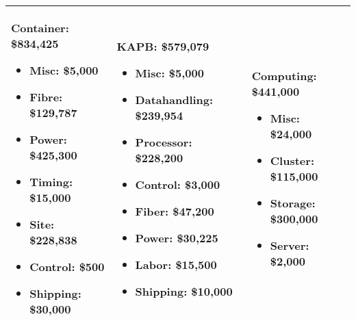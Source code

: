 \begin{table}[t]
\begin{tabular}{| p{2in} | p{2in} | p{2in} | }
\noindent
\textbf{Container:}  \$834,425
\begin{itemize}[parsep=-2pt, itemsep=-3pt]
\item Misc:   \$5,000
\item Fibre:   \$129,787
\item Power:   \$425,300
\item Timing:   \$15,000
\item Site:   \$228,838
\item Control:   \$500
\item Shipping:   \$30,000
\end{itemize}
 &
 \noindent
\textbf{KAPB:}  \$579,079
\begin{itemize}[parsep=-2pt, itemsep=-3pt]
\item Misc:   \$5,000
\item Datahandling:   \$239,954
\item Processor:   \$228,200
\item Control:   \$3,000
\item Fiber:   \$47,200
\item Power:   \$30,225
\item Labor:   \$15,500
\item Shipping:   \$10,000
\end{itemize}
 &
 \noindent
\textbf{Computing:}  \$441,000
\begin{itemize}[parsep=-2pt, itemsep=-3pt]
\item Misc:   \$24,000
\item Cluster:   \$115,000
\item Storage:   \$300,000
\item Server:   \$2,000
\end{itemize}
\\ \hline
\end{tabular}
\end{table}